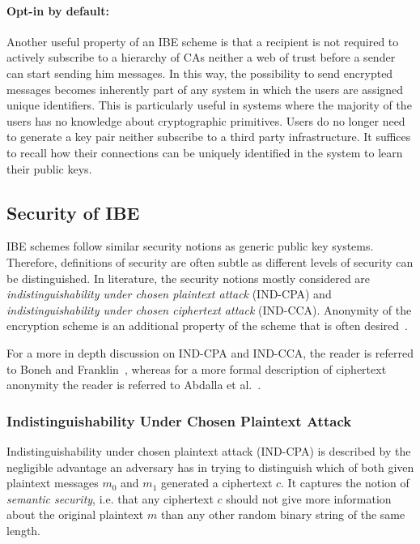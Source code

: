 \paragraph{Opt-in by default:}
Another useful property of an IBE scheme is that a recipient is not required to actively subscribe to a hierarchy of CAs neither a web of trust before a sender can start sending him messages. In this way, the possibility to send encrypted messages becomes inherently part of any system in which the users are assigned unique identifiers. This is particularly useful in systems where the majority of the users has no knowledge about cryptographic primitives. Users do no longer need to generate a key pair neither subscribe to a third party infrastructure. It suffices to recall how their connections can be uniquely identified in the system to learn their public keys.

\subsection{Security of IBE}
IBE schemes follow similar security notions as generic public key systems. Therefore, definitions of security are often subtle as different levels of security can be distinguished. In literature, the security notions mostly considered are \textit{indistinguishability under chosen plaintext attack} (IND-CPA) and \textit{indistinguishability under chosen ciphertext attack} (IND-CCA). Anonymity of the encryption scheme is an additional property of the scheme that is often desired~\cite{art:BellareBDP01}.

For a more in depth discussion on IND-CPA and IND-CCA, the reader is referred to Boneh and Franklin~\cite{art:BonehF01}, whereas for a more formal description of ciphertext anonymity the reader is referred to Abdalla et al.~\cite{art:AbdallaBCKKLMNPS05}.

\subsubsection{Indistinguishability Under Chosen Plaintext Attack}
Indistinguishability under chosen plaintext attack (IND-CPA) is described by the negligible advantage an adversary has in trying to distinguish which of both given plaintext messages $m_0$ and $m_1$ generated a ciphertext $c$. It captures the notion of \textit{semantic security}, i.e. that any ciphertext $c$ should not give more information about the original plaintext $m$ than any other random binary string of the same length.

